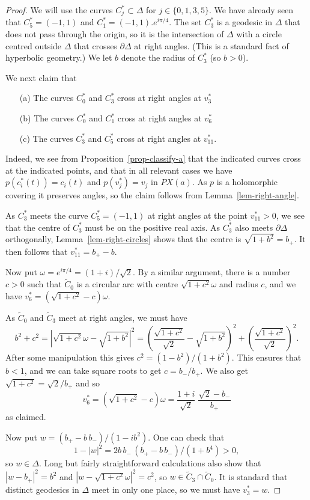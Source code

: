 \documentclass[reqno]{amsart}
\newcommand{\Dl}        {\Delta}
\newcommand{\om}        {\omega}
\newcommand{\rt}        {\sqrt{2}}
\newcommand{\tC}	{\widetilde{C}}
\renewcommand{\:}{\colon}
\theoremstyle{definition}
\begin{document}
\begin{proof}
 We will use the curves $C_j^*\subset\Dl$ for $j\in\{0,1,3,5\}$.  We
 have already seen that $C_5^*=(-1,1)$ and $C_1^*=(-1,1).e^{i\pi/4}$.
 The set $C_3^*$ is a geodesic in $\Dl$ that does not pass through the
 origin, so it is the intersection of $\Dl$ with a circle centred
 outside $\Dl$ that crosses $\partial\Dl$ at right angles.  (This is a
 standard fact of hyperbolic geometry.)  We let $b$ denote the radius
 of $C_3^*$ (so $b>0$).

 We next claim that
 \begin{itemize}
  \item[(a)] The curves $C_0^*$ and $C_3^*$ cross at right angles at $v_3^*$
  \item[(b)] The curves $C_0^*$ and $C_1^*$ cross at right angles at $v_6^*$
  \item[(c)] The curves $C_3^*$ and $C_5^*$ cross at right angles at $v_{11}^*$.
 \end{itemize}
 Indeed, we see from Proposition~\ref{prop-classify-a} that the
 indicated curves cross at the indicated points, and that in all
 relevant cases we have $p(c_i^*(t))=c_i(t)$ and $p(v_j^*)=v_j$ in
 $PX(a)$.  As $p$ is a holomorphic covering it preserves angles, so
 the claim follows from Lemma~\ref{lem-right-angle}.

 As $C^*_3$ meets the curve $C^*_5=(-1,1)$ at right angles at the
 point $v^*_{11}>0$, we see that the centre of $C^*_3$ must be on the
 positive real axis.  As $C^*_3$ also meets $\partial\Dl$
 orthogonally, Lemma~\ref{lem-right-circles} shows that the centre is
 $\sqrt{1+b^2}=b_+$.  It then follows that $v^*_{11}=b_+-b$.

 Now put $\om=e^{i\pi/4}=(1+i)/\rt$.  By a similar argument,
 there is a number $c>0$ such that $\tC_0$ is a circular arc with
 centre $\sqrt{1+c^2}\om$ and radius $c$, and we have
 $v^*_6=(\sqrt{1+c^2}-c)\om$.

 As $\tC_0$ and $\tC_3$ meet at right angles, we must have
 \[ b^2+c^2 = |\sqrt{1+c^2}\om - \sqrt{1+b^2}|^2 =
     \left(\frac{\sqrt{1+c^2}}{\rt} - \sqrt{1+b^2}\right)^2 +
     \left(\frac{\sqrt{1+c^2}}{\rt}\right)^2.
 \]
 After some manipulation this gives $c^2=(1-b^2)/(1+b^2)$.  This
 ensures that $b<1$, and we can take square roots to get $c=b_-/b_+$.
 We also get $\sqrt{1+c^2}=\rt/b_+$ and so
 \[ v^*_6 = (\sqrt{1+c^2}-c)\om =
     \frac{1+i}{\rt}\;\frac{\rt-b_-}{b_+}
 \]
 as claimed.

 Now put $w=(b_+-b\,b_-)/(1-ib^2)$.  One can check that
 \[ 1 - |w|^2 = 2b\,b_-\,(b_+-b\,b_-)/(1+b^4) > 0, \]
 so $w\in\Dl$.  Long but fairly straightforward calculations also show
 that $|w-b_+|^2=b^2$ and $|w-\sqrt{1+c^2}\om|^2=c^2$, so
 $w\in\tC_3\cap\tC_0$.  It is standard that distinct geodesics in
 $\Dl$ meet in only one place, so we must have $v^*_3=w$.


\end{proof}
\end{document}
